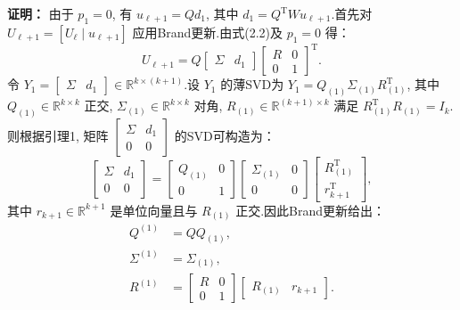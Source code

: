 \noindent\textbf{证明：} 
由于 $p_1=0$, 有 $u_{\ell+1}=Q d_1$, 其中 $d_1 = Q^{\mathrm T}W u_{\ell+1}$.首先对 $U_{\ell+1}=[U_\ell\mid u_{\ell+1}]$ 应用Brand更新.由式(2.2)及 $p_1=0$ 得：
\begin{equation}
U_{\ell+1} = Q \begin{bmatrix}\Sigma & d_1\end{bmatrix} \begin{bmatrix}R & 0\\0 & 1\end{bmatrix}^{\mathrm T}.
\end{equation}
令 $Y_1 = \begin{bmatrix}\Sigma & d_1\end{bmatrix} \in \mathbb{R}^{k\times (k+1)}$.设 $Y_1$ 的薄SVD为 $Y_1 = Q_{(1)}\Sigma_{(1)}R_{(1)}^{\mathrm T}$, 其中 $Q_{(1)}\in\mathbb{R}^{k\times k}$ 正交, $\Sigma_{(1)}\in\mathbb{R}^{k\times k}$ 对角, $R_{(1)}\in\mathbb{R}^{(k+1)\times k}$ 满足 $R_{(1)}^{\mathrm T}R_{(1)}=I_k$.则根据引理1, 矩阵 $\begin{bmatrix}\Sigma & d_1\\0 & 0\end{bmatrix}$ 的SVD可构造为：
\begin{equation}
\begin{bmatrix}\Sigma & d_1\\0 & 0\end{bmatrix} = \begin{bmatrix}Q_{(1)} & 0\\0 & 1\end{bmatrix} \begin{bmatrix}\Sigma_{(1)} & 0\\0 & 0\end{bmatrix} \begin{bmatrix}R_{(1)}^{\mathrm T}\\ r_{k+1}^{\mathrm T}\end{bmatrix},
\end{equation}
其中 $r_{k+1}\in\mathbb{R}^{k+1}$ 是单位向量且与 $R_{(1)}$ 正交.因此Brand更新给出：
\begin{align}
Q^{(1)} &= Q Q_{(1)}, \label{eq:Q1}\\
\Sigma^{(1)} &= \Sigma_{(1)}, \label{eq:S1}\\
R^{(1)} &= \begin{bmatrix}R & 0\\0 & 1\end{bmatrix} \begin{bmatrix}R_{(1)} & r_{k+1}\end{bmatrix}. \label{eq:R1}
\end{align}

